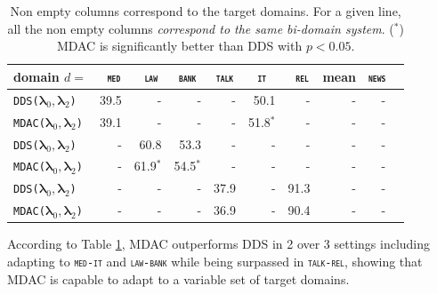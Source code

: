 \documentclass[11pt]{article}
\newcommand{\domain}[1]{\texttt{\textsc{#1}}}
\newcommand{\system}[1]{\texttt{{#1}}}
\newcommand{\vlambda}{\ensuremath{\boldsymbol\lambda}\xspace} %
\begin{document}
\begin{table}[htbp]
  \centering \small
  \begin{tabular}{|l|*9{r|}} \hline
    domain \hfill $d=$ & \multicolumn{1}{c|}{\domain{ med}} & \multicolumn{1}{c|}{\domain{ law}} & \multicolumn{1}{c|}{\domain{bank}} & \multicolumn{1}{c|}{\domain{talk}} & \multicolumn{1}{c|}{\domain{ it }} & \multicolumn{1}{c|}{\domain{ rel}} & \multicolumn{1}{c|}{mean} & \multicolumn{1}{|c|}{\domain{news}} \\ \hline \hline
    \system{DDS($\vlambda_0, \vlambda_2$)}&39.5&-&-&-&50.1&-&-&- \\
    \system{MDAC($\vlambda_0, \vlambda_2$)}&39.1&-&-&-&51.8$^*$&-&-&- \\
    \system{DDS($\vlambda_0, \vlambda_2$)}&-&60.8&53.3&-&-&-&-&- \\
    \system{MDAC($\vlambda_0, \vlambda_2$)}&-&61.9$^*$&54.5$^*$&-&-&-&-&- \\
    \system{DDS($\vlambda_0, \vlambda_2$)}&-&-&-&37.9&-&91.3&-&- \\ 
    \system{MDAC($\vlambda_0, \vlambda_2$)}&-&-&-&36.9&-&90.4&-&- \\
    \hline
  \end{tabular}
  \caption{Non empty columns correspond to the target domains. For a given line, all the non empty columns \emph{correspond to the same bi-domain system}. ($^*$) MDAC is significantly better than DDS with $p<0.05$.}
  \label{tab:bi-da}
\end{table}
According to Table \ref{tab:bi-da}, MDAC outperforms DDS in 2 over 3 settings including adapting to \domain{med-it} and \domain{law-bank} while being surpassed in \domain{talk-rel}, showing that MDAC is capable to adapt to a variable set of target domains.
\end{document}
